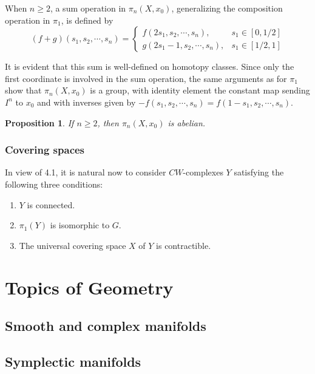 \documentclass{book}
\newtheorem{prop}{Proposition}
\begin{document}
When $n \geq 2$, a sum operation in $\pi_n\left(X, x_0\right)$, generalizing the composition operation in $\pi_1$, is defined by
$$
(f+g)\left(s_1, s_2, \cdots, s_n\right)= \begin{cases}f\left(2 s_1, s_2, \cdots, s_n\right), & s_1 \in[0,1 / 2] \\ g\left(2 s_1-1, s_2, \cdots, s_n\right), & s_1 \in[1 / 2,1]\end{cases}
$$

It is evident that this sum is well-defined on homotopy classes. Since only the first coordinate is involved in the sum operation, the same arguments as for $\pi_1$ show that $\pi_n\left(X, x_0\right)$ is a group, with identity element the constant map sending $I^n$ to $x_0$ and with inverses given by $-f\left(s_1, s_2, \cdots, s_n\right)=f\left(1-s_1, s_2, \cdots, s_n\right)$.


\begin{prop}
    If $n \geq 2$, then $\pi_n\left(X, x_0\right)$ is abelian.
\end{prop}


\section{Covering spaces}


In view of 4.1, it is natural now to consider $C W$-complexes $Y$ satisfying the following three conditions:
\begin{enumerate}
    \item $Y$ is connected.
    \item $\pi_1(Y)$ is isomorphic to $G$.
    \item The universal covering space $X$ of $Y$ is contractible.
\end{enumerate}








\part{Topics of Geometry}

\chapter{Smooth and complex manifolds}

\chapter{Symplectic manifolds}
\end{document}
